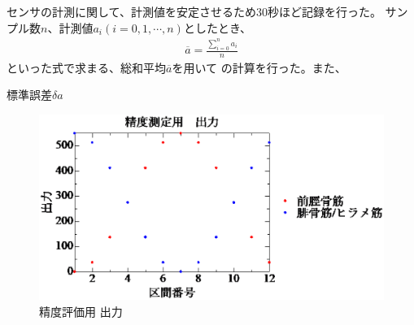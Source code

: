センサの計測に関して、計測値を安定させるため30秒ほど記録を行った。
サンプル数$n$、計測値$a_i \left(i=0,1,\cdots,n\right)$としたとき、
\begin{eqnarray}
        \overline{a}=\frac{\sum^n_{i=0}a_i}{n}
\end{eqnarray}
といった式で求まる、総和平均$\overline{a}$を用いて
の計算を行った。また、

標準誤差$\delta a$
\begin{figure}[h]
    \begin{center}
        \includegraphics[width=0.78\columnwidth,clip]{2_measurement/output/output.eps}
        \caption{精度評価用 出力}
        \label{output_for_test}
    \end{center}
\end{figure}